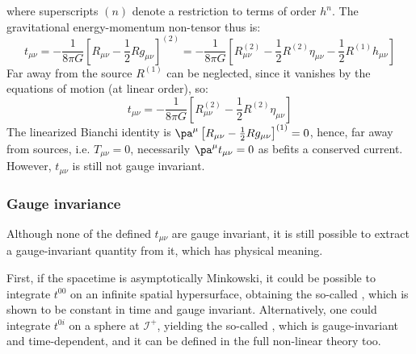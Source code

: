 where superscripts $ (n) $ denote a restriction to terms of order $ h^n $. The gravitational energy-momentum non-tensor thus is:
\begin{equation*}
  t_{\mu \nu} = - \frac{1}{8\pi G} \left[ R_{\mu \nu} - \frac{1}{2} R g_{\mu \nu} \right]^{(2)} = - \frac{1}{8\pi G} \left[ R^{(2)}_{\mu \nu} - \frac{1}{2} R^{(2)} \eta_{\mu \nu} - \frac{1}{2} R^{(1)} h_{\mu \nu} \right]
\end{equation*}
Far away from the source $ R^{(1)} $ can be neglected, since it vanishes by the equations of motion (at linear order), so:
\begin{equation}
  t_{\mu \nu} = - \frac{1}{8\pi G} \left[ R^{(2)}_{\mu \nu} - \frac{1}{2} R^{(2)} \eta_{\mu \nu} \right]
  \label{eq:5.30}
\end{equation}
The linearized Bianchi identity is $ \pa^\mu \left[ R_{\mu \nu} - \frac{1}{2} R g_{\mu \nu} \right]^{(1)} = 0 $, hence, far away from sources, i.e. $ T_{\mu \nu} = 0 $, necessarily $ \pa^\mu t_{\mu \nu} = 0 $ as befits a conserved current. However, $ t_{\mu \nu} $ is still not gauge invariant.

\subsubsection{Gauge invariance}

Although none of the defined $ t_{\mu \nu} $ are gauge invariant, it is still possible to extract a gauge-invariant quantity from it, which has physical meaning.

First, if the spacetime is asymptotically Minkowski, it could be possible to integrate $ t^{00} $ on an infinite spatial hypersurface, obtaining the so-called , which is shown to be constant in time and gauge invariant. Alternatively, one could integrate $ t^{0i} $ on a sphere at $ \mathcal{I}^+ $, yielding the so-called , which is gauge-invariant and time-dependent, and it can be defined in the full non-linear theory too.

